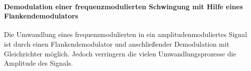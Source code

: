 \paragraph{Demodulation einer frequenzmodulierten Schwingung
mit Hilfe eines Flankendemodulators}
Die Umwandlung eines frequenzmodulierten in ein
amplitudenmoduliertes Signal ist durch einen Flankendemodulator
und anschließender Demodulation mit Gleichrichter
möglich. Jedoch verringern die
vielen Umwandlungsprozesse die Amplitude des Signals.
